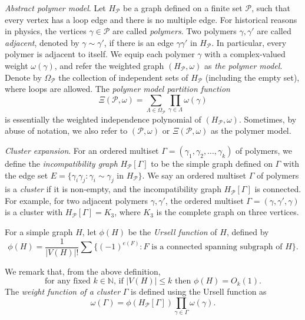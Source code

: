 \documentclass{amsart}
\theoremstyle{definition}
\newcommand{\we}{\omega}
\newcommand{\NN}{\mathbb{N}}
\newcommand{\cP}{\mathcal{P} }
\newcommand{\beq}[1]{\begin{equation}\label{#1}}
\newcommand{\enq}[0]{\end{equation}}
\newcommand{\nin}[0]{\noindent}
\newcommand{\0}[0]{\emptyset}
\begin{document}
\nin \textit{Abstract polymer model}. 
Let $H_{\cP}$ be a graph  defined on a finite set $\cP$, such that every vertex has a loop edge and there is no multiple edge.
For historical reasons in physics, the vertices $\gamma \in \cP$ are called \textit{polymers}.
Two polymers $\gamma, \gamma'$ are called \textit{adjacent}, denoted by $\gamma\sim \gamma'$, if there is an edge $\gamma\gamma'$ in $H_{\cP}$.
In particular, every polymer is adjacent to itself.
We equip each polymer $\gamma$ with a complex-valued weight $\we(\gamma)$, and refer the weighted graph $(H_{\cP}, \we)$ as \textit{the polymer model}. 
Denote by $\Omega_{\cP}$ the collection of independent sets of $H_{\cP}$ (including the empty set), where loops are allowed.
The \textit{polymer model partition function} 
\begin{equation}\label{def:partitionfunction}
  \Xi(\cP, \we)=\sum_{\Lambda\in \Omega_{\cP}}\prod_{\gamma\in \Lambda}\we(\gamma)
\end{equation}
is essentially the weighted independence polynomial of $(H_{\cP}, \we)$.
Sometimes, by abuse of notation, we also refer to $(\cP,\we)$ or $\Xi(\cP, \we)$ as the polymer model.
\vspace{5pt}

\nin \textit{Cluster expansion}. 
For an ordered multiset $\Gamma=(\gamma_1, \gamma_2, \ldots, \gamma_k)$ of polymers,
we define the \textit{incompatibility graph} $H_{\cP}[\Gamma]$ to be the simple graph defined on $\Gamma$ with the edge set $E=\{\gamma_i\gamma_j: \gamma_i\sim \gamma_j \text{ in } H_{\cP}\}$.
We say an ordered multiset $\Gamma$ of polymers is a \textit{cluster} if it is non-empty, and the incompatibility graph $H_{\cP}[\Gamma]$ is connected.
For example, for two adjacent polymers $\gamma, \gamma'$, the ordered multiset $\Gamma=(\gamma, \gamma', \gamma)$ is a cluster with $H_{\cP}[\Gamma]=K_3$, where $K_3$ is the complete graph on three vertices.

For a simple graph $H$, let $\phi(H)$ be the \textit{Ursell function} of $H$, defined by
\[
\phi(H)=\frac{1}{|V(H)|!}\sum \{(-1)^{e(F)}: \mbox{$F$ is a connected spanning subgraph of $H$}\}.\]

We remark that, from the above definition,
\beq{ursell} \mbox{for any fixed $k \in \NN$, if $|V(H)|\le k$ then $\phi(H)=O_k(1)$.}\enq
The \textit{weight function of a cluster} $\Gamma$ is defined using the Ursell function as
\begin{equation}\label{def:cluweight}
   \we(\Gamma)=\phi(H_{\cP}[\Gamma])\prod_{\gamma\in \Gamma}\we(\gamma).
\end{equation}
\end{document}
